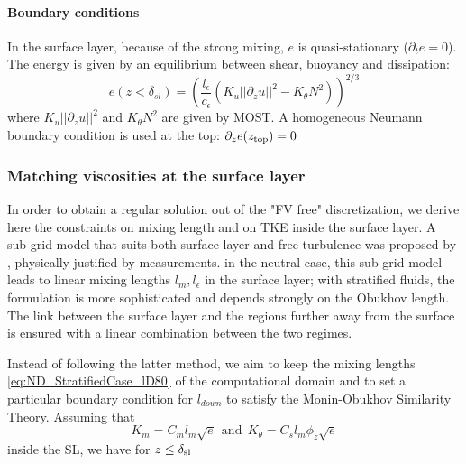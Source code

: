 \paragraph{Boundary conditions}
In the surface layer, because of the strong mixing, $e$ is
quasi-stationary ($\partial_t e = 0$). The energy is given by
an equilibrium between shear, buoyancy and dissipation:
\begin{equation}
	\label{eq:ND_StratifiedCase_TKE_SL_cond}
e(z<\delta_{sl}) = \left(\frac{l_\epsilon}{c_\epsilon}
(K_u||\partial_z u||^2 - K_\theta N^2)\right)^{2/3}
\end{equation}
where $K_u||\partial_z u||^2$ and $K_\theta N^2$ are given by MOST.
A homogeneous Neumann boundary condition is used at the top:
$\partial_z e (z_{\rm top}) = 0$

\subsubsection{Matching viscosities at the surface layer}
\label{sec:ND_StratifiedCase_mixing_lengths_match}
In order to obtain a regular solution out of the "FV free"
discretization, we derive here the constraints on mixing length
and on TKE inside the surface layer.
A sub-grid model that suits both
surface layer and free turbulence was proposed by
\citep{redelsperger_simple_2001}, physically
justified by measurements.
in the neutral case, this sub-grid model leads to linear
mixing lengths $l_m, l_{\epsilon}$ in the surface layer;
with stratified fluids, the formulation is more sophisticated
and depends strongly on the Obukhov length.
The link between the surface layer and the regions
further away from the surface is ensured with a linear combination
between the two regimes.
%
\par
Instead of following the latter method,
we aim to keep the mixing lengths \eqref{eq:ND_StratifiedCase_lD80}
of the computational domain and
to set a particular boundary condition for $l_{down}$
to satisfy the Monin-Obukhov Similarity Theory.
Assuming that 
\begin{equation}
	\label{eq:ND_StratifiedCase_viscosities_assumption}
K_m = C_m l_m \sqrt{e} ~~\text{and}~~
K_\theta = C_s l_m \phi_z \sqrt{e}
\end{equation}
 inside the SL, we have
for $z\leq \delta_{\rm sl}$
